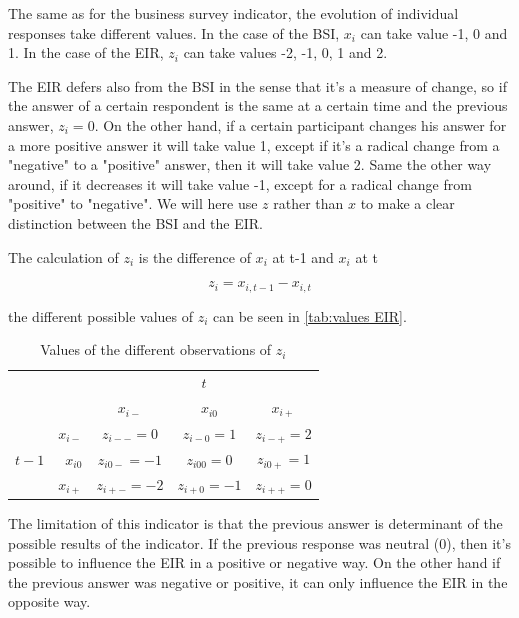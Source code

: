 \documentclass[12pt,a4paper,oneside]{book}
\begin{document}
The same as for the business survey indicator, the evolution of individual responses take different values. In the case of the BSI, $x_i$ can take value -1, 0 and 1. In the case of the EIR, $z_i$ can take values -2, -1, 0, 1 and 2.

The EIR defers also from the BSI in the sense that it's a measure of change, so if the answer of a certain respondent is the same at a certain time and the previous answer, $z_i=0$. 
On the other hand, if a certain participant changes his answer for a more positive answer it will take value 1, except if it's a radical change from a "negative" to a "positive" answer, then it will take value 2.
Same the other way around, if it decreases it will take value -1, except for a radical change from "positive" to "negative".
We will here use $z$ rather than $x$ to make a clear distinction between the BSI and the EIR.

The calculation of $z_i$ is the difference of $x_i$ at t-1 and $x_i$ at t

\begin{equation}
    z_i = x_{i,t-1} - x_{i,t}
\end{equation}

the different possible values of $z_i$ can be seen in \autoref{tab:values EIR}. 

\begin{table}[htp!]
    \caption{Values of the different observations of $z_i$}
    \label{tab:values EIR}
    \centering \footnotesize
    \begin{tabular}{r | r | c c c | }
    \multicolumn{1}{r}{} & \multicolumn{1}{r}{} &    \multicolumn{3}{c}{$t$} \\ \cline{3-5}
    \multicolumn{1}{r}{} &         & \textbf{$x_{i-}$} & \textbf{$x_{i0}$} & \textbf{$x_{i+}$} \\ \cline{2-5}
           &    \textbf{$x_{i-}$} & $z_{i--}=0$    & $z_{i-0}=1$    & $z_{i-+}=2$ \\ 
    $t-1$ & \textbf{$x_{i0}$}  & $z_{i0-}=-1$    & $z_{i00}=0$    & $z_{i0+}=1$    \\
            & \textbf{$x_{i+}$}& $z_{i+-}=-2$    & $z_{i+0}=-1$    & $z_{i++}=0$ \\ \cline{2-5}
\end{tabular}
\end{table}


The limitation of this indicator is that the previous answer is determinant of the possible results of the indicator. 
If the previous response was neutral (0), then it's possible to influence the EIR in a positive or negative way. 
On the other hand if the previous answer was negative or positive, it can only influence the EIR in the opposite way.
\end{document}
